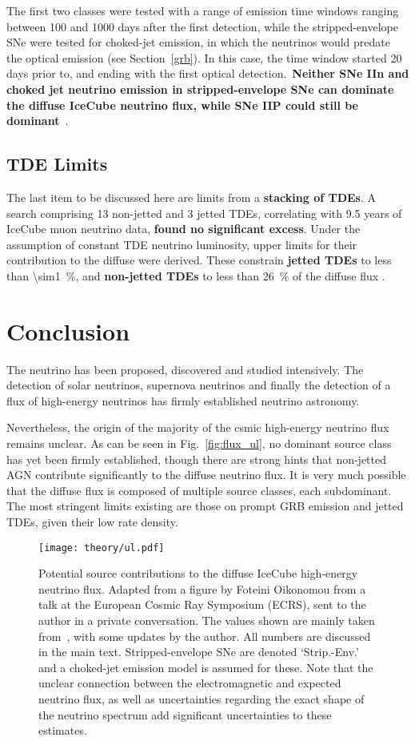 The first two classes were tested with a range of emission time windows ranging between 100 and 1000 days after the first detection, while the stripped-envelope SNe were tested for choked-jet emission, in which the neutrinos would predate the optical emission (see Section~\ref{grb}). In this case, the time window started 20 days prior to, and ending with the first optical detection.\ \textbf{Neither SNe IIn and choked jet neutrino emission in stripped-envelope SNe can dominate the diffuse IceCube neutrino flux, while SNe IIP could still be dominant}~\cite{Necker2023}.

\subsection{TDE Limits}
The last item to be discussed here are limits from a \textbf{stacking of TDEs}. A search comprising 13 non-jetted and 3 jetted TDEs, correlating with 9.5 years of IceCube muon neutrino data, \textbf{found no significant excess}. Under the assumption of constant TDE neutrino luminosity, upper limits for their contribution to the diffuse were derived. These constrain \textbf{jetted TDEs} to less than \SI{\sim1}{\percent}, and \textbf{non-jetted TDEs} to less than \SI{26}{\percent} of the diffuse flux .

\section{Conclusion}
The neutrino has been proposed, discovered and studied intensively. The detection of solar neutrinos, supernova neutrinos and finally the detection of a flux of high-energy neutrinos has firmly established neutrino astronomy.

Nevertheless, the origin of the majority of the csmic high-energy neutrino flux remains unclear. As can be seen in Fig.~\ref{fig:flux_ul}, no dominant source class has yet been firmly established, though there are strong hints that non-jetted AGN contribute significantly to the diffuse neutrino flux. It is very much possible that the diffuse flux is composed of multiple source classes, each subdominant. The most stringent limits existing are those on prompt GRB emission and jetted TDEs, given their low rate density.

\begin{figure}[htb]
    \texttt{[image: theory/ul.pdf]}
    \caption[Contribution to HE neutrino flux]{Potential source contributions to the diffuse IceCube high-energy neutrino flux. Adapted from a figure by Foteini Oikonomou from a talk at the  European Cosmic Ray Symposium (ECRS), sent to the author in a private conversation. The values shown are mainly taken from~\cite{Guepin2022}, with some updates by the author. All numbers are discussed in the main text. Stripped-envelope SNe are denoted `Strip.-Env.' and a choked-jet emission model is assumed for these. Note that the unclear connection between the electromagnetic and expected neutrino flux, as well as uncertainties regarding the exact shape of the neutrino spectrum add significant uncertainties to these estimates.}
\end{figure}

